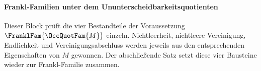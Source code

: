 \documentclass[main.tex]{subfiles}
\begin{document}
\begin{tabproof}
\end{tabproof}

\paragraph{Frankl-Familien unter dem Ununterscheidbarkeitsquotienten}

Dieser Block prüft die vier Bestandteile der Voraussetzung
\(\FranklFam{\OccQuotFam{M}}\) einzeln. Nichtleerheit, nichtleere Vereinigung,
Endlichkeit und Vereinigungsabschluss werden jeweils aus den entsprechenden
Eigenschaften von \(M\) gewonnen. Der abschließende Satz setzt diese vier
Bausteine wieder zur Frankl-Familie zusammen.

\begin{tabproof}
\end{tabproof}
\end{document}
